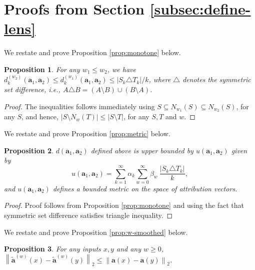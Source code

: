 \documentclass[letterpaper]{article} %
\newtheorem{prop}{Proposition}
\def\ba{\mathbf{a}}
\newcommand{\norm}[1]{\left\|#1\right\|}
\newcommand{\size}[1]{\left|#1\right|}
\begin{document}
\section{Proofs from Section \ref{subsec:define-lens}} \label{app:proofs}
We restate and prove Proposition \ref{prop:monotone} below.
\begin{prop} 
For any $w_{1} \leq w_{2}$, we have $d_{k}^{(w_{2})}(\ba_{1}, \ba_{2}) \leq d_{k}^{(w_{1})}(\ba_{1}, \ba_{2}) \leq \size{S_{k} \triangle T_{k}}/k$, where $\triangle$ denotes the symmetric set difference, i.e., $A \triangle B = (A \setminus B) \cup (B \setminus A)$.
\end{prop}
\begin{proof}
The inequalities follows immediately using $S \subseteq N_{w_{1}}(S) \subseteq N_{w_{2}}(S)$, for any $S$, and hence, $\size{S \setminus N_{w}(T)} \leq \size{S \setminus T}$, for any $S, T$ and $w$.
\end{proof}
We restate and prove Proposition \ref{prop:metric} below.
\begin{prop}
$d(\ba_{1}, \ba_{2})$ defined above is upper bounded by $u(\ba_{1}, \ba_{2})$ given by
\[
u(\ba_{1}, \ba_{2}) = \sum_{k=1}^{\infty} \alpha_{k} \sum_{w=0}^{\infty} \beta_{w}~ \frac{\size{S_{k} \triangle T_{k}}}{k},
\]
and $u(\ba_{1}, \ba_{2})$ defines a bounded metric on the space of attribution vectors.
\end{prop}
\begin{proof}
Proof follows from Proposition \ref{prop:monotone} and using the fact that symmetric set difference satisfies triangle inequality.
\end{proof}
We restate and prove Proposition \ref{prop:w-smoothed} below.
\begin{prop}
For any inputs $x, y$ and any $w \geq 0$, $\norm{\tilde{\ba}^{(w)}(x) - \tilde{\ba}^{(w)}(y)}_{2} \leq \norm{\ba(x) - \ba(y)}_{2}$.
\end{prop}
\end{document}
